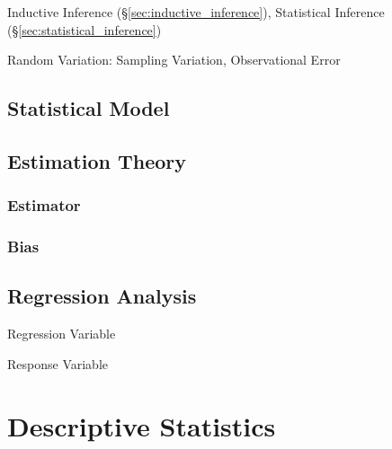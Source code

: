 Inductive Inference (\S\ref{sec:inductive_inference}), Statistical
Inference (\S\ref{sec:statistical_inference})

Random Variation: Sampling Variation, Observational Error



\subsection{Statistical Model}\label{sec:statistical_model}

\subsection{Estimation Theory}\label{sec:estimation_theory}

\subsubsection{Estimator}\label{sec:estimator}

\subsubsection{Bias}\label{sec:bias}



\subsection{Regression Analysis}\label{sec:regression_analysis}

Regression Variable

Response Variable



\section{Descriptive Statistics}\label{sec:descriptive_statistics}

